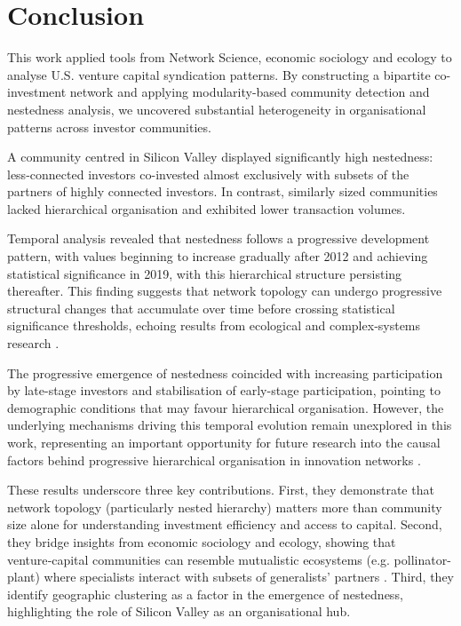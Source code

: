 \section{Conclusion}

This work applied tools from Network Science, economic sociology and ecology to analyse U.S. venture capital syndication patterns. By constructing a bipartite co-investment network and applying modularity-based community detection and nestedness analysis, we uncovered substantial heterogeneity in organisational patterns across investor communities.  

A community centred in Silicon Valley displayed significantly high nestedness: less-connected investors co-invested almost exclusively with subsets of the partners of highly connected investors. In contrast, similarly sized communities lacked hierarchical organisation and exhibited lower transaction volumes.

Temporal analysis revealed that nestedness follows a progressive development pattern, with values beginning to increase gradually after 2012 and achieving statistical significance in 2019, with this hierarchical structure persisting thereafter. This finding suggests that network topology can undergo progressive structural changes that accumulate over time before crossing statistical significance thresholds, echoing results from ecological and complex‑systems research \cite{Scheffer2009,Mariani2019}.  

The progressive emergence of nestedness coincided with increasing participation by late-stage investors and stabilisation of early-stage participation, pointing to demographic conditions that may favour hierarchical organisation. However, the underlying mechanisms driving this temporal evolution remain unexplored in this work, representing an important opportunity for future research into the causal factors behind progressive hierarchical organisation in innovation networks \cite{Mariani2019, Lerner1994, Casamatta2007}.

These results underscore three key contributions. First, they demonstrate that network topology (particularly nested hierarchy) matters more than community size alone for understanding investment efficiency and access to capital.  Second, they bridge insights from economic sociology and ecology, showing that venture‑capital communities can resemble mutualistic ecosystems (e.g. pollinator-plant) where specialists interact with subsets of generalists’ partners \cite{Bascompte2003,Thebault2010}.  Third, they identify geographic clustering as a factor in the emergence of nestedness, highlighting the role of Silicon Valley as an organisational hub.

